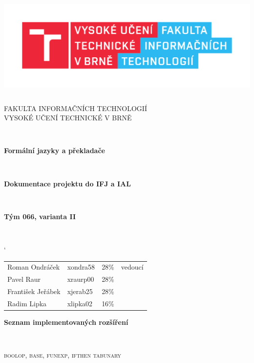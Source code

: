 \documentclass[12pt]{article}
\begin{document}
\begin{titlepage}
	\begin{center}

		\includegraphics[height = 150pt]{img/FIT_barevne_CMYK_CZ.pdf} \\

		\begin{LARGE}
			\textsc{FAKULTA INFORMAČNÍCH TECHNOLOGIÍ} \\
			\textsc{VYSOKÉ UČENÍ TECHNICKÉ V BRNĚ}
		\end{LARGE}
		\\[5mm]
		
		\begin{LARGE}
			\textbf{Formální jazyky a překladače} 
		\end{LARGE}
        \\[20mm]
		\begin{Large}
				\textbf{Dokumentace projektu do IFJ a IAL} 
		\end{Large}
		\\[20mm]
		\begin{Large}
				\textbf{Tým 066, varianta II} 
		\end{Large}
		\\[20mm]
\begin{table}[h]
\centering
\begin{large}	
\catcode`
    \begin{tabular}{l l l l}
         Roman Ondráček & xondra58 & 28\% & vedoucí\\
         Pavel Raur & xraurp00 & 28\% &\\
         František Jeřábek & xjerab25 & 28\% &\\
         Radim Lipka & xlipka02 & 16\% & 
    \end{tabular}
\end{large}
\end{table}
\vfill
\begin{Large}
				\textbf{Seznam implementovaných rozšíření}
\end{Large}
\\[5mm]
\begin{Large}
			    \textsc{boolop, base, funexp, ifthen tabunary} 
\end{Large}
\end{center}
\end{titlepage}
\end{document}
